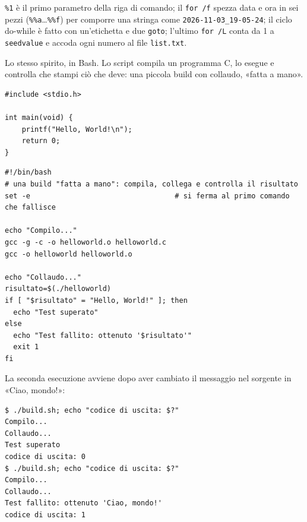 \texttt{\%1} è il primo parametro della riga di comando; il \texttt{for /f} spezza data e ora in sei pezzi
(\texttt{\%\%a}\ldots\texttt{\%\%f}) per comporre una stringa come \texttt{2026-11-03\_19-05-24}; il ciclo do-while è
fatto con un'etichetta e due \texttt{goto}; l'ultimo \texttt{for /L} conta da 1 a \texttt{seedvalue} e accoda ogni numero
al file \texttt{list.txt}.


Lo stesso spirito, in Bash. Lo script compila un programma C, lo esegue e controlla che stampi ciò che deve: una piccola
build con collaudo, «fatta a mano».

\begin{lstlisting}[style=c, name=helloworld.c]
#include <stdio.h>

int main(void) {
    printf("Hello, World!\n");
    return 0;
}
\end{lstlisting}

\begin{lstlisting}[style=shell, name=build.sh]
#!/bin/bash
# una build "fatta a mano": compila, collega e controlla il risultato
set -e                                  # si ferma al primo comando che fallisce

echo "Compilo..."
gcc -g -c -o helloworld.o helloworld.c
gcc -o helloworld helloworld.o

echo "Collaudo..."
risultato=$(./helloworld)
if [ "$risultato" = "Hello, World!" ]; then
  echo "Test superato"
else
  echo "Test fallito: ottenuto '$risultato'"
  exit 1
fi
\end{lstlisting}

La seconda esecuzione avviene dopo aver cambiato il messaggio nel sorgente in «Ciao, mondo!»:

\begin{lstlisting}[style=shell, name=Terminale]
$ ./build.sh; echo "codice di uscita: $?"
Compilo...
Collaudo...
Test superato
codice di uscita: 0
$ ./build.sh; echo "codice di uscita: $?"
Compilo...
Collaudo...
Test fallito: ottenuto 'Ciao, mondo!'
codice di uscita: 1
\end{lstlisting}

